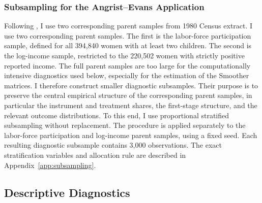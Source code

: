 \documentclass[12pt, a4paper, oneside]{article}
\theoremstyle{plain}
\theoremstyle{definition}
\begin{document}
\subsubsection{Subsampling for the Angrist--Evans Application}
Following \citet{sloczynski2025abadie}, I use two corresponding parent samples from \citet{farbmacher2018increasing} 1980 Census extract.
I use two corresponding parent samples. The first is the labor-force participation sample, defined for all 394,840 women with at least two children. The second is the log-income sample, restricted to the 220,502 women with strictly positive reported income.
The full parent samples are too large for the computationally intensive diagnostics used below, especially for the estimation of the Smoother matrices.
I therefore construct smaller diagnostic subsamples. Their purpose is to preserve the central empirical structure of the corresponding parent samples, in particular the instrument and treatment shares, the first-stage structure, and the relevant outcome distributions.
To this end, I use proportional stratified subsampling without replacement. 
The procedure is applied separately to the labor-force participation and log-income parent samples, using a fixed seed. Each resulting diagnostic subsample contains 3,000 observations.
The exact stratification variables and allocation rule are described in Appendix~\ref{app:subsampling}.

\subsection{Descriptive Diagnostics}
\end{document}
